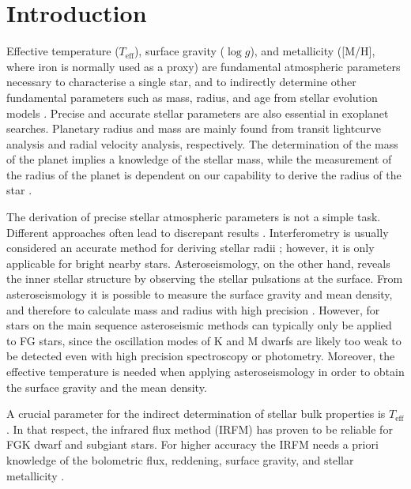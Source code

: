 \documentclass{aa}
\begin{document}
\section{Introduction}
\label{sec:introduction}

Effective temperature ($T_\mathrm{eff}$), surface gravity ($\log g$),
and metallicity ([M/H], where iron is normally used as a proxy)
are fundamental atmospheric parameters necessary to characterise a single
star, and to indirectly determine other fundamental parameters
such as mass, radius, and age from stellar evolution models
\citep[see e.g.][]{Girardi2000,Dotter2008,Baraffe2015}.
Precise and accurate stellar parameters are also essential in
exoplanet searches. Planetary radius and mass are mainly found from
transit lightcurve analysis and radial velocity analysis, respectively. The
determination of the mass of the planet implies a knowledge of the
stellar mass, while the measurement of the radius of the planet
is dependent on our capability to derive the radius of the star
\citep[see e.g.][]{Torres2008,Ammler2009,Torres2012}.

The derivation of precise stellar atmospheric parameters is not a simple task.
Different approaches often lead to discrepant results
\citep[see e.g.][]{Torres2010,Lebzelter2012b,Santos13}. Interferometry is
usually considered  an accurate method for deriving stellar radii
\citep[see e.g.][]{Boyajian2012}; however, it is only applicable for bright
nearby stars. Asteroseismology, on the other hand, reveals the inner stellar
structure by observing the stellar pulsations at the surface. From
asteroseismology it is possible to measure the surface gravity and mean density,
and therefore to calculate mass and radius with high precision \citep[see
e.g.][]{Kjeldsen1995}. However, for stars on the main sequence asteroseismic
methods can typically only be applied to FG stars, since the oscillation modes
of K and M dwarfs are likely too weak to be detected even with high precision
spectroscopy or photometry. Moreover, the effective temperature is needed when
applying asteroseismology in order to obtain the surface gravity and the mean
density.

A crucial parameter for the indirect determination of stellar bulk properties is
$T_\mathrm{eff}$. In that respect, the infrared flux method (IRFM) has
proven to be reliable for FGK dwarf and subgiant stars. For higher accuracy the
IRFM needs a priori knowledge of the bolometric flux, reddening, surface
gravity, and stellar metallicity
\citep{Blackwell1977,Ramirez2005b,Casagrande2010}.
\end{document}
